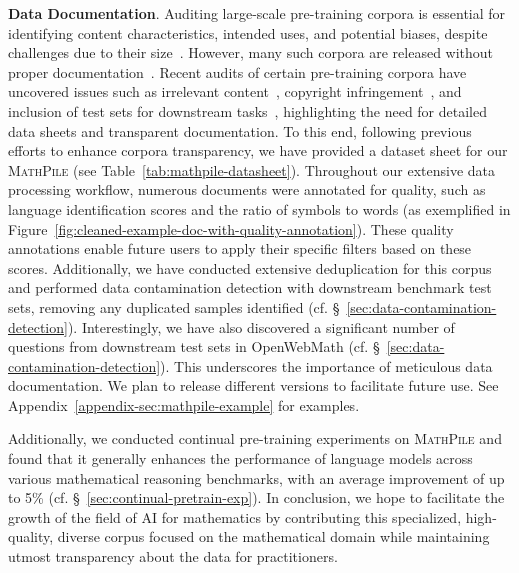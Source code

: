 \textbf{Data Documentation}. Auditing large-scale pre-training corpora is essential for identifying content characteristics, intended uses, and potential biases, despite challenges due to their size~\citep{bender-friedman-2018-data,10.1145/3458723-datasheets-for-datasets,10.1145/3594737-data-statements}. However, many such corpora are released without proper documentation~\citep{DBLP:journals/corr/abs-2212-05129-measuring-data}. Recent audits of certain pre-training corpora have uncovered issues such as irrelevant content~\citep{luccioni-viviano-2021-whats,kreutzer-etal-2022-quality,DBLP:journals/corr/abs-2310-20707-what-in-my-big-data}, copyright infringement~\citep{DBLP:journals/corr/abs-2105-05241-datasheet-for-bookcorpus}, and inclusion of test sets for downstream tasks~\citep{10.1145/3359591.3359735-code-duplication,dodge-etal-2021-documenting}, highlighting the need for detailed data sheets and transparent documentation. To this end, following previous efforts to enhance corpora transparency,  we have provided a dataset sheet for our {\textsc{MathPile }} (see Table~\ref{tab:mathpile-datasheet}). Throughout our extensive data processing workflow, numerous documents were annotated for quality, such as language identification scores and the ratio of symbols to words (as exemplified in Figure~\ref{fig:cleaned-example-doc-with-quality-annotation}). These quality annotations enable future users to apply their specific filters based on these scores. Additionally, we have conducted extensive deduplication for this corpus and performed data contamination detection with downstream benchmark test sets, removing any duplicated samples identified (cf. \S~\ref{sec:data-contamination-detection}). Interestingly, we have also discovered a significant number of questions from downstream test sets in OpenWebMath (cf. \S~\ref{sec:data-contamination-detection}). This underscores the importance of meticulous data documentation. We plan to release different versions to facilitate future use. See Appendix~\ref{appendix-sec:mathpile-example} for examples.

Additionally, we conducted continual pre-training experiments on {\textsc{MathPile }} and found that it generally enhances the performance of language models across various mathematical reasoning benchmarks, with an average improvement of up to 5\% (cf. \S~\ref{sec:continual-pretrain-exp}). In conclusion, we hope to facilitate the growth of the field of AI for mathematics by contributing this specialized, high-quality, diverse corpus focused on the mathematical domain while maintaining utmost transparency about the data for practitioners. 


